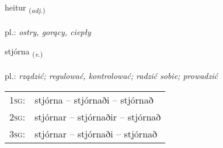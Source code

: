 \documentclass[frontgrid, backgrid]{flacards}\usepackage[]{graphicx}\usepackage[]{xcolor}
\begin{document}
\renewcommand{\flhead}{\vskip5pt \fboxsep=0pt {\small\bfseries\footnotesize Lýsingarorð | Adjective}}
\renewcommand{\fcfoot}{\vskip5pt \fboxsep=0pt \hspace{2pt}{\small\bfseries\footnotesize 1K}}

\renewcommand{\blhead}{\vskip5pt {\small\bfseries\footnotesize Lýsingarorð | Adjective }}
\renewcommand{\bcfoot}{\vskip5pt \hspace{2pt}{\small\bfseries\footnotesize 1K}}


{heitur \small{\textsubscript{(\textit{adj.})}} \\[1ex] %
\textphonetic{[heiːtʏr]} \\
pl.: \emph{ostry, gorący, ciepły} \\  [2ex]
\renewcommand*{\arraystretch}{0.8}
}

\renewcommand{\flhead}{\vskip5pt \fboxsep=0pt {\small\bfseries\footnotesize Sagnorð | Verb}}
\renewcommand{\fcfoot}{\vskip5pt \fboxsep=0pt \hspace{2pt}{\small\bfseries\footnotesize 1K}}

\renewcommand{\blhead}{\vskip5pt {\small\bfseries\footnotesize Sagnorð | Verb }}
\renewcommand{\bcfoot}{\vskip5pt \hspace{2pt}{\small\bfseries\footnotesize 1K}}


{stjórna \small{\textsubscript{(\textit{v.})}} \\[1ex] %
\textphonetic{[stjourtna]} \\
pl.: \emph{rządzić; regulować, kontrolować; radzić sobie; prowadzić} \\  [2ex]
\renewcommand*{\arraystretch}{0.8}
\begin{tabular}{p{1cm}l}
\textsc{1sg}: & stjórna -- stjórnaði -- stjórnað \\ 
\textsc{2sg}: & stjórnar -- stjórnaðir -- stjórnað \\ 
\textsc{3sg}: & stjórnar -- stjórnaði -- stjórnað \\ 
\end{tabular}
}
\end{document}
